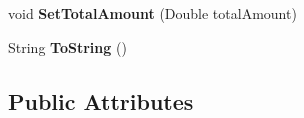 \begin{DoxyCompactItemize}
\item 
\hypertarget{classcom_1_1shephertz_1_1app42_1_1paas_1_1sdk_1_1csharp_1_1shopping_1_1_cart_1_1_item_a073b4ff4d3a59e9193248e7cb4282eab}{void {\bfseries Set\+Total\+Amount} (Double total\+Amount)}\label{classcom_1_1shephertz_1_1app42_1_1paas_1_1sdk_1_1csharp_1_1shopping_1_1_cart_1_1_item_a073b4ff4d3a59e9193248e7cb4282eab}

\item 
\hypertarget{classcom_1_1shephertz_1_1app42_1_1paas_1_1sdk_1_1csharp_1_1shopping_1_1_cart_1_1_item_a8a5db6c11c60d8b4521ae78c9ddd31f3}{String {\bfseries To\+String} ()}\label{classcom_1_1shephertz_1_1app42_1_1paas_1_1sdk_1_1csharp_1_1shopping_1_1_cart_1_1_item_a8a5db6c11c60d8b4521ae78c9ddd31f3}

\end{DoxyCompactItemize}
\subsection*{Public Attributes}
